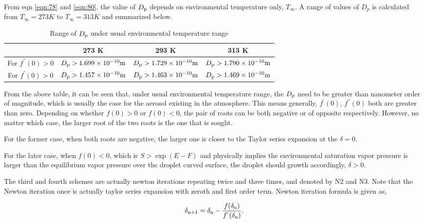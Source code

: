\documentclass[12pt]{article}
\begin{document}
{From eqn \ref{eqn:78} and \ref{eqn:80}, the value of $D_{\rm p}$ depends on environmental temperature only, $T_{\infty}$. A range of values of $D_{p}$ is calculated from $T_{\infty}=273K$ to $T_{\infty}=313K$ and summarized below.

\begin{table}\label{table:2}
\caption{Range of $D_{\rm p}$ under usual environmental temperature range}
\begin{center}
\begin{tabular}{cccc} \hline
   & 273 K  &  293 K  &  313 K \\ \hline
For $f^{''}(0)>0 $ & $D_{\rm p}>1.699\times 10^{-10} \rm m$  & $D_{\rm p}>1.729\times 10^{-10} \rm m$ & $D_{\rm p}>1.790\times 10^{-10} \rm m$   \\ 
For $f^{'}(0)>0 $  & $D_{\rm p}>1.457\times 10^{-10} \rm m$ &  $D_{\rm p}>1.463\times 10^{-10} \rm m$ & $D_{\rm p}>1.469\times 10^{-10 \rm } \rm m$ \\ \hline
\end{tabular}
\end{center}
\end{table}

From the above table, it can be seen that, under usual environmental temperature range, the $D_{\rm p}$ need to be greater than nanometer order of magnitude, which is usually the case for the aerosol existing in the atmosphere.
This means generally, $f^{'}(0)$, $f^{''}(0)$ both are greater than zero. Depending on whether $f(0)>0$ or $f(0)<0$, the pair of roots can be both negative or of opposite respectively. However, no matter which case, the larger root of the two roots is the one that is sought. 

For the former case, when both roots are negative, the larger one is closer to the Taylor series expansion at the $\delta=0$. 


For the later case, when $f(0)<0$, which is $S>\exp(E-F)$ and physically implies the environmental saturation vapor pressure is larger than the equilibrium vapor pressure over the droplet curved surface, the droplet should growth accordingly, $\delta>0$.


The third and fourth schemes are actually newton iterations repeating twice and three times, and denoted by N2 and N3. Note that the Newton iteration once is actually taylor series expansion with zeroth and first order term. Newton iteration formula is given as,

\begin{equation}
\delta_{\rm n+1}=\delta_{\rm n}-\frac{f(\delta_{\rm n})}{f^{'}(\delta_{\rm n})}.
\end{equation}

}
\end{document}
